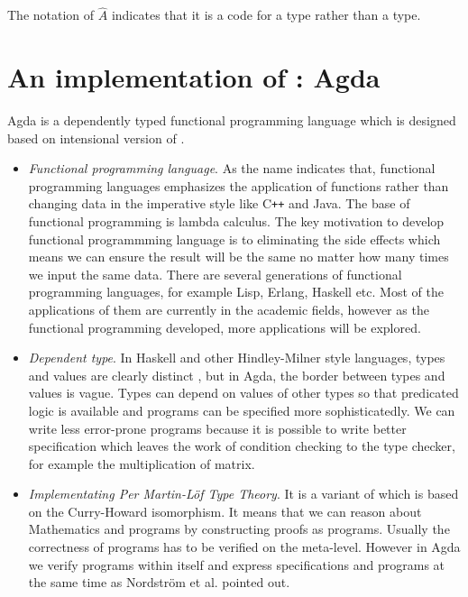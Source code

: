 The notation of $\hat{A}$ indicates that it is a code for a type rather than a type.


\section{An implementation of \mltt: Agda}

Agda is a dependently typed functional programming language which is designed based on intensional version
of \mltt \cite{agdawiki:main}. 

\begin{itemize}

\item \textit{Functional programming language}. As the name indicates that, functional programming languages emphasizes the application of functions rather than changing data in the imperative style like C{}\verb!++! and Java. The base of functional programming is lambda calculus. The key motivation to develop functional programmming language is to eliminating the side effects which means we can ensure the result will be the same no matter how many times we input the same data. There are several generations of functional programming languages, for example Lisp, Erlang, Haskell etc. Most of the applications of them are currently in the academic fields, however as the functional programming developed, more applications will be explored.

\item \textit{Dependent type}. 
In Haskell and other Hindley-Milner style languages, types and values are clearly distinct \cite{tutorial}, but in Agda, the border between types and values is vague. Types can depend on values of other types \cite{dtw} so that predicated logic is available and programs can be specified more sophisticatedly. We can write less error-prone programs because it is possible to write better specification which leaves the work of condition checking to the type checker, for example the multiplication of matrix.


\item \textit{Implementating Per Martin-Löf Type Theory}. It is a variant of \itt which is based on the Curry-Howard isomorphism\cite{aboa}. It means that we can reason about Mathematics and programs by constructing proofs as programs. Usually the correctness of programs has to be verified on the meta-level. However in Agda we verify programs within itself and express specifications and  programs at the same time as Nordström et al. \cite{nps} pointed out.
\end{itemize}




